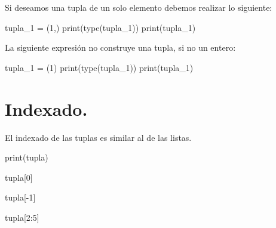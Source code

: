 \documentclass[
  letterpaper,
  DIV=11,
  numbers=noendperiod]{scrreprt}
\newenvironment{Shaded}{\begin{snugshade}}{\end{snugshade}}
\newcommand{\BuiltInTok}[1]{\textcolor[rgb]{0.00,0.23,0.31}{#1}}
\newcommand{\DecValTok}[1]{\textcolor[rgb]{0.68,0.00,0.00}{#1}}
\newcommand{\NormalTok}[1]{\textcolor[rgb]{0.00,0.23,0.31}{#1}}
\newcommand{\OperatorTok}[1]{\textcolor[rgb]{0.37,0.37,0.37}{#1}}
\begin{document}
Si deseamos una tupla de un solo elemento debemos realizar lo siguiente:

\begin{Shaded}
\begin{Highlighting}[]
\NormalTok{tupla\_1 }\OperatorTok{=}\NormalTok{ (}\DecValTok{1}\NormalTok{,)}
\BuiltInTok{print}\NormalTok{(}\BuiltInTok{type}\NormalTok{(tupla\_1))}
\BuiltInTok{print}\NormalTok{(tupla\_1)}
\end{Highlighting}
\end{Shaded}

La siguiente expresión no construye una tupla, si no un entero:

\begin{Shaded}
\begin{Highlighting}[]
\NormalTok{tupla\_1 }\OperatorTok{=}\NormalTok{ (}\DecValTok{1}\NormalTok{)}
\BuiltInTok{print}\NormalTok{(}\BuiltInTok{type}\NormalTok{(tupla\_1))}
\BuiltInTok{print}\NormalTok{(tupla\_1)}
\end{Highlighting}
\end{Shaded}

\section{Indexado.}\label{indexado.}

El indexado de las tuplas es similar al de las listas.

\begin{Shaded}
\begin{Highlighting}[]
\BuiltInTok{print}\NormalTok{(tupla)}
\end{Highlighting}
\end{Shaded}

\begin{Shaded}
\begin{Highlighting}[]
\NormalTok{tupla[}\DecValTok{0}\NormalTok{]}
\end{Highlighting}
\end{Shaded}

\begin{Shaded}
\begin{Highlighting}[]
\NormalTok{tupla[}\OperatorTok{{-}}\DecValTok{1}\NormalTok{]}
\end{Highlighting}
\end{Shaded}

\begin{Shaded}
\begin{Highlighting}[]
\NormalTok{tupla[}\DecValTok{2}\NormalTok{:}\DecValTok{5}\NormalTok{]}
\end{Highlighting}
\end{Shaded}
\end{document}
